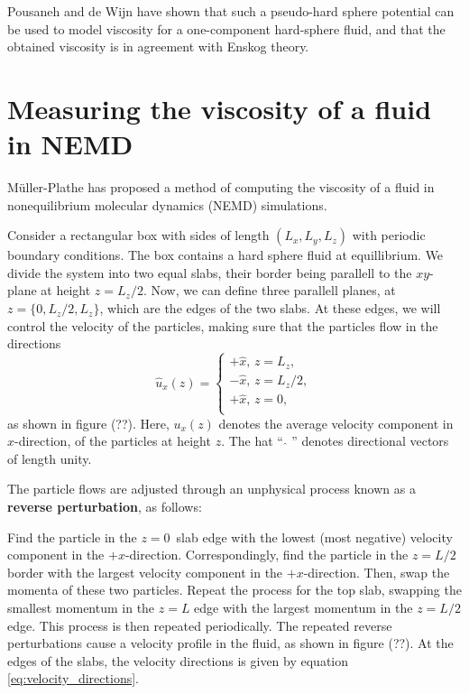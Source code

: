 Pousaneh and de Wijn \cite{ref:pousaneh:shear_viscosity} 
have shown that such a pseudo-hard sphere potential 
can be used to model viscosity for a one-component hard-sphere fluid, 
and that the obtained viscosity is in agreement with Enskog theory.

\section{Measuring the viscosity of a fluid in NEMD}
Müller-Plathe \cite{ref:mullerplathe:reversing_the_perturbation} 
has proposed a method of computing the viscosity of a fluid in 
nonequilibrium molecular dynamics (NEMD) simulations.

Consider a rectangular box with sides of length $(L_x, L_y, L_z)$ 
with periodic boundary conditions.
The box contains a hard sphere fluid at equillibrium.
We divide the system into two equal slabs, their border 
being parallell to the $xy$-plane at height $z = L_z/2$.
Now, we can define three parallell planes, at 
$z = \{0, L_z/2, L_z\}$, which are the edges of the two slabs.
At these edges, we will control the velocity of the particles, 
making sure that the particles flow in the directions
\begin{equation}
    \label{eq:velocity_directions}
    \hat{u}_x(z) =
    \begin{cases}
        +\hat{x}, \,z = L_z,    \\
        -\hat{x}, \,z = L_z/2,  \\
        +\hat{x}, \,z = 0,    \\
    \end{cases}
\end{equation}
as shown in figure (??). %
Here, $u_x(z)$ denotes the average velocity component 
in $x$-direction, of the particles at height $z$.
The hat ``$\,\, \hat{ } \,\,$'' denotes 
directional vectors of length unity.

The particle flows are adjusted through an unphysical process known as a 
\textbf{reverse perturbation}\cite{ref:mullerplathe:reversing_the_perturbation},
as follows:

Find the particle in the $z = 0$ slab edge with the lowest 
(most negative) velocity component in the $+x$-direction.
Correspondingly, find the particle in the $z = L/2$ border 
with the largest velocity component in the $+x$-direction.
Then, swap the momenta of these two particles.
Repeat the process for the top slab, swapping the smallest momentum 
in the $z = L$ edge with the largest momentum in the $z = L/2$ edge.
This process is then repeated periodically.
The repeated reverse perturbations cause a velocity profile in the fluid,
as shown in figure (??). %
At the edges of the slabs, the velocity directions 
is given by equation \eqref{eq:velocity_directions}.

